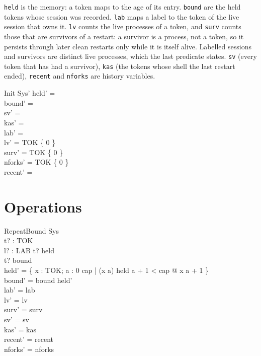 \documentclass[a4paper,10pt,fleqn]{article}
\begin{document}
\texttt{held} is the memory: a token maps to the age of its entry.
\texttt{bound} are the held tokens whose session was recorded.  \texttt{lab}
maps a label to the token of the live session that owns it.  \texttt{lv} counts
the live processes of a token, and \texttt{surv} counts those that are
survivors of a restart: a survivor is a process, not a token, so it persists
through later clean restarts only while it is itself alive.  Labelled sessions
and survivors are distinct live processes, which the last predicate states.
\texttt{sv} (every token that has had a survivor), \texttt{kas} (the tokens whose shell the last restart ended), \texttt{recent} and
\texttt{nforks} are history variables.

\begin{schema}{Init}
  Sys'
\where
  held' = \emptyset \\
  bound' = \emptyset \\
  sv' = \emptyset \\
  kas' = \emptyset \\
  lab' = \emptyset \\
  lv' = TOK \cross \{ 0 \} \\
  surv' = TOK \cross \{ 0 \} \\
  nforks' = TOK \cross \{ 0 \} \\
  recent' = \langle \rangle
\end{schema}

\section{Operations}

\begin{schema}{RepeatBound}
  \Delta Sys \\
  t? : TOK \\ l? : LAB
\where
  t? \in \dom held \\
  t? \in bound \\
  held' = \{ x : TOK; a : 0 \upto cap | (x \mapsto a) \in held \land a + 1 < cap @ x \mapsto a + 1 \} \\
  bound' = bound \cap \dom held' \\
  lab' = lab \\
  lv' = lv \\
  surv' = surv \\
  sv' = sv \\
  kas' = kas \\
  recent' = recent \\
  nforks' = nforks
\end{schema}
\end{document}
